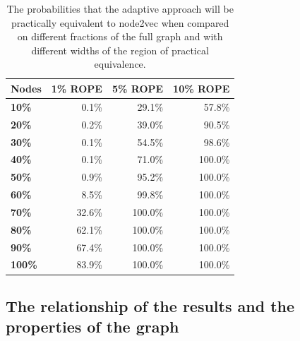 \documentclass[sn-mathphys,pdflatex,iicol]{sn-jnl}%
\begin{document}
\begin{table}
  \begin{center}
    \begin{minipage}{210pt} %
      \caption{The probabilities that the adaptive approach will be practically equivalent to node2vec when compared on different fractions of the full graph and with different widths of the region of practical equivalence.}
      \label{tab:bayesian-adaptive}
      \begin{tabular}{lrrr}
        \toprule
        \textbf{Nodes} & \textbf{1\% ROPE} & \textbf{5\% ROPE} & \textbf{10\% ROPE} \\
        \midrule
        \textbf{10\%}  & 0.1\%             & 29.1\%            & 57.8\%             \\
        \textbf{20\%}  & 0.2\%             & 39.0\%            & 90.5\%             \\
        \textbf{30\%}  & 0.1\%             & 54.5\%            & 98.6\%             \\
        \textbf{40\%}  & 0.1\%             & 71.0\%            & 100.0\%            \\
        \textbf{50\%}  & 0.9\%             & 95.2\%            & 100.0\%            \\
        \textbf{60\%}  & 8.5\%             & 99.8\%            & 100.0\%            \\
        \textbf{70\%}  & 32.6\%            & 100.0\%           & 100.0\%            \\
        \textbf{80\%}  & 62.1\%            & 100.0\%           & 100.0\%            \\
        \textbf{90\%}  & 67.4\%            & 100.0\%           & 100.0\%            \\
        \textbf{100\%} & 83.9\%            & 100.0\%           & 100.0\%            \\
        \bottomrule
      \end{tabular}
    \end{minipage}
  \end{center}
\end{table}

\subsection{The relationship of the results and the properties of the graph}
\end{document}
